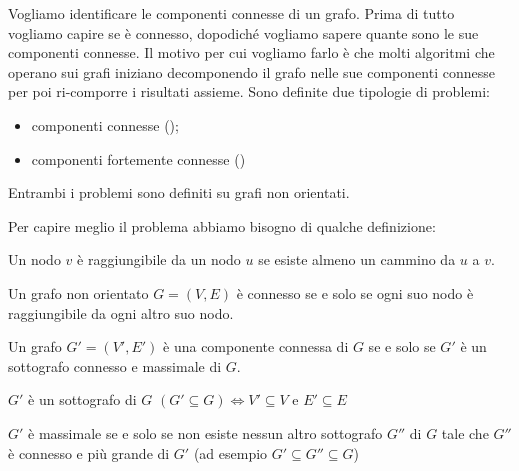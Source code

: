 Vogliamo identificare le componenti connesse di un grafo.
Prima di tutto vogliamo capire se è connesso, dopodiché vogliamo sapere quante sono le sue componenti connesse.
Il motivo per cui vogliamo farlo è che molti algoritmi che operano sui grafi iniziano decomponendo il grafo nelle sue componenti connesse per poi ri-comporre i risultati assieme.
Sono definite due tipologie di problemi:
\begin{itemize}
	\item componenti connesse ();
	\item componenti fortemente connesse ()
\end{itemize}
Entrambi i problemi sono definiti su grafi non orientati.

Per capire meglio il problema abbiamo bisogno di qualche definizione:
\begin{definition}
	Un nodo \(v\) è raggiungibile da un nodo \(u\) se esiste almeno un cammino da \(u\) a \(v\).
\end{definition}


\begin{definition}
	Un grafo non orientato \(G = (V, E)\) è connesso se e solo se ogni suo nodo è raggiungibile da ogni altro suo nodo.
\end{definition}


\begin{definition}
	Un grafo \(G' = (V', E')\) è una componente connessa di \(G\) se e solo se \(G'\) è un sottografo connesso e massimale di \(G\).
\end{definition}

\begin{definition}[Sottografo]
	\(G'\) è un sottografo di \(G\) \((G' \subseteq G) \Leftrightarrow V' \subseteq V\) e \(E' \subseteq E\)
\end{definition}

\begin{definition}
	\(G'\) è massimale se e solo se non esiste nessun altro sottografo \(G''\) di \(G\) tale che \(G''\) è connesso e più grande di \(G'\) (ad esempio \(G' \subseteq G'' \subseteq G\))
\end{definition}

